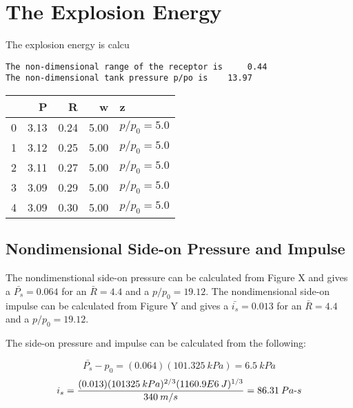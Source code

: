 \documentclass[10pt,parskip=half,
toc=sectionentrywithdots,
bibliography=totocnumbered,
captions=tableheading,numbers=noendperiod]{scrartcl}
\begin{document}
\hypertarget{the-explosion-energy}{%
\section{The Explosion Energy}\label{the-explosion-energy}}

The explosion energy is calcu

\begin{lstlisting}[language={},postbreak={},numbers=none,xrightmargin=7pt,belowskip=5pt,aboveskip=5pt,breakindent=0pt]
The non-dimensional range of the receptor is     0.44
The non-dimensional tank pressure p/po is    13.97

\end{lstlisting}

\begin{table}[H]
\centering
\begin{adjustbox}{max width=\textwidth}
\begin{tabular}{lrrrl}
\toprule
{} &        P &        R &        w &            z \\
\midrule
0 &     3.13 &     0.24 &     5.00 &  $p/p_0=5.0$ \\
1 &     3.12 &     0.25 &     5.00 &  $p/p_0=5.0$ \\
2 &     3.11 &     0.27 &     5.00 &  $p/p_0=5.0$ \\
3 &     3.09 &     0.29 &     5.00 &  $p/p_0=5.0$ \\
4 &     3.09 &     0.30 &     5.00 &  $p/p_0=5.0$ \\
\bottomrule
\end{tabular}

\end{adjustbox}
\end{table}

\hypertarget{nondimensional-side-on-pressure-and-impulse}{%
\subsection{Nondimensional Side-on Pressure and
Impulse}\label{nondimensional-side-on-pressure-and-impulse}}

The nondimenstional side-on pressure can be calculated from Figure X and
gives a \(\bar{P_s} = 0.064\) for an \(\bar{R}=4.4\) and a
\(p/p_0 = 19.12\). The nondimensional side-on impulse can be calculated
from Figure Y and gives a \(\bar{i_s} = 0.013\) for an \(\bar{R}=4.4\)
and a \(p/p_0 = 19.12\).

The side-on pressure and impulse can be calculated from the following:

\begin{equation}\bar{P_s} - p_0 = (0.064)(101.325\:kPa) = 6.5\:kPa\end{equation}
\begin{equation}i_s = \frac{(0.013)(101325\:kPa)^{2/3}(1160.9E6\:J)^{1/3}}{340\:m/s}= 86.31\:Pa {\text -} s\end{equation}



\end{document}
